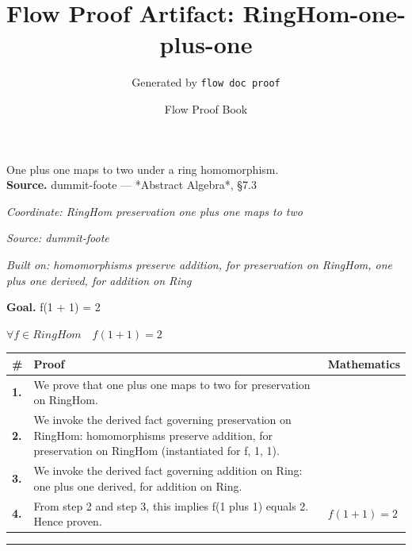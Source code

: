 \documentclass[11pt]{article}
\title{Flow Proof Artifact: RingHom-one-plus-one}
\author{Generated by \texttt{flow doc proof}}
\date{Flow Proof Book}
\theoremstyle{definition}
\begin{document}
\maketitle
One plus one maps to two under a ring homomorphism.\\[0.5em]
\textbf{Source.} dummit-foote — *Abstract Algebra*, §7.3\\[0.5em]
\bigskip
{}\par
\smallskip\noindent\textit{Coordinate: RingHom \cdot preservation \cdot one plus one maps to two}\par
\smallskip\noindent\textit{Source: dummit-foote}\par
\smallskip\noindent\textit{Built on: homomorphisms preserve addition, for preservation on RingHom, one plus one derived, for addition on Ring}\par
\medskip
\noindent\textbf{Goal.} f(1 + 1) = 2\par
\noindent$\displaystyle \forall f \in RingHom\quad f(1 + 1) = 2$\par
\medskip
\noindent
\begin{tabular}{@{} >{\raggedright\arraybackslash}p{} >{\raggedright\arraybackslash}p{} >{\raggedleft\arraybackslash}p{} @{}}
\textbf{\#} & \textbf{Proof} & \textbf{Mathematics} \\
\midrule
\textbf{1.} & We prove that one plus one maps to two for preservation on RingHom. & \\[0.45em]
\textbf{2.} & We invoke the derived fact governing preservation on RingHom: homomorphisms preserve addition, for preservation on RingHom (instantiated for f, 1, 1). & \\[0.45em]
\textbf{3.} & We invoke the derived fact governing addition on Ring: one plus one derived, for addition on Ring. & \\[0.45em]
\textbf{4.} & From step 2 and step 3, this implies f(1 plus 1) equals 2. Hence proven. & $\displaystyle f(1 + 1) = 2$ \\[0.45em]
\bottomrule
\end{tabular}
\label{thm:RingHom-preservation-one_plus_one_maps_to_two}
\par\medskip\hrule
\end{document}
